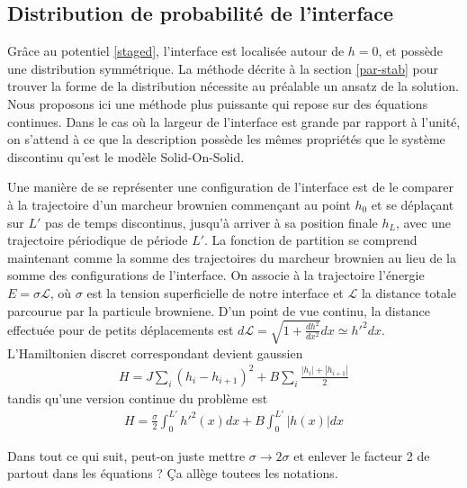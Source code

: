     \subsection{Distribution de probabilité de l'interface}


Grâce au potentiel \ref{staged}, l'interface est localisée autour de $h=0$, et possède une distribution symmétrique. La méthode décrite à la section \ref{par-stab} pour trouver la forme de la distribution nécessite au préalable un ansatz de la solution. Nous proposons ici une méthode plus puissante qui repose sur des équations continues. Dans le cas où la largeur de l'interface est grande par rapport à l'unité, on s'attend à ce que la description possède les mêmes propriétés que le système discontinu qu'est le modèle Solid-On-Solid.

Une manière de se représenter une configuration de l'interface est de le comparer à la trajectoire d'un marcheur brownien commençant au point $h_0$ et se déplaçant sur $L'$ pas de temps discontinus, jusqu'à arriver à sa position finale $h_L$, avec une trajectoire périodique de période $L'$. La fonction de partition se comprend maintenant comme la somme des trajectoires du marcheur brownien au lieu de la somme des configurations de l'interface. On associe à la trajectoire l'énergie $E = \sigma \mathcal{L}$, où $\sigma$ est la tension superficielle de notre interface et $\mathcal{L}$ la distance totale parcourue par la particule browniene. D'un point de vue continu, la distance effectuée pour de petits déplacements est $d\mathcal{L} = \sqrt{1+\frac{dh^2}{dx^2}} dx \simeq h'^2 dx$.
L'Hamiltonien discret correspondant devient gaussien
\begin{align}
    H = J \sum_i (h_i-h_{i+1})^2 + B \sum_i \frac{|h_i|+|h_{i+1}|}{2}
    \label{hamil-gauss}
\end{align}
tandis qu'une version continue du problème est 
\begin{align}
	H = \frac{\sigma}{2} \int_0^{L'} h'^2(x) dx + B \int_0^{L'} |h(x)|dx
\end{align}

{\color{red} Dans tout ce qui suit, peut-on juste mettre $\sigma \to 2 \sigma$ et enlever le facteur 2 de partout dans les équations ? Ça allège toutees les notations.}

